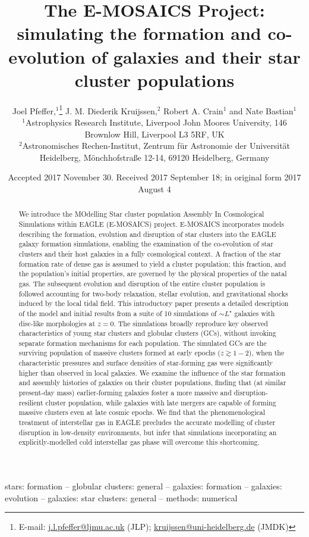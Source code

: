 \documentclass[fleqn,usenatbib]{mnras}
\title[The E-MOSAICS project]{The E-MOSAICS Project: simulating the formation and co-evolution of galaxies and their star cluster populations}
\author[J. Pfeffer et al.]{
Joel Pfeffer,$^{1}$\thanks{E-mail: \href{j.l.pfeffer@ljmu.ac.uk}{j.l.pfeffer@ljmu.ac.uk} (JLP); \href{kruijssen@uni-heidelberg.de}{kruijssen@uni-heidelberg.de} (JMDK)}
J. M. Diederik Kruijssen,$^{2}${\color{blue}\footnotemark[1]}
Robert A. Crain$^{1}$
and Nate Bastian$^{1}$
\\
$^{1}$Astrophysics Research Institute, Liverpool John Moores University, 146 Brownlow Hill, Liverpool L3 5RF, UK\\
$^{2}$Astronomisches Rechen-Institut, Zentrum f\"{u}r Astronomie der Universit\"{a}t Heidelberg, M\"{o}nchhofstra\ss e 12-14, 69120 Heidelberg, Germany\\
}
\date{Accepted 2017 November 30. Received 2017 September 18; in original form 2017 August 4}
\begin{document}
\label{firstpage}
\pagerange{\pageref{firstpage}--\pageref{lastpage}}
\maketitle

\begin{abstract}
We introduce the MOdelling Star cluster population Assembly In Cosmological Simulations within EAGLE (E-MOSAICS) project. E-MOSAICS incorporates models describing the formation, evolution and disruption of star clusters into the EAGLE galaxy formation simulations, enabling the examination of the co-evolution of star clusters and their host galaxies in a fully cosmological context. A fraction of the star formation rate of dense gas is assumed to yield a cluster population; this fraction, and the population's initial properties, are governed by the physical properties of the natal gas. The subsequent evolution and disruption of the entire cluster population is followed accounting for two-body relaxation, stellar evolution, and gravitational shocks induced by the local tidal field. This introductory paper presents a detailed description of the model and initial results from a suite of 10 simulations of $\sim L^\star$ galaxies with disc-like morphologies at $z=0$. The simulations broadly reproduce key observed characteristics of young star clusters and globular clusters (GCs), without invoking separate formation mechanisms for each population. The simulated GCs are the surviving population of massive clusters formed at early epochs ($z\gtrsim1-2$), when the characteristic pressures and surface densities of star-forming gas were significantly higher than observed in local galaxies. We examine the influence of the star formation and assembly histories of galaxies on their cluster populations, finding that (at similar present-day mass) earlier-forming galaxies foster a more massive and disruption-resilient cluster population, while galaxies with late mergers are capable of forming massive clusters even at late cosmic epochs. We find that the phenomenological treatment of interstellar gas in EAGLE precludes the accurate modelling of cluster disruption in low-density environments, but infer that simulations incorporating an explicitly-modelled cold interstellar gas phase will overcome this shortcoming.
\end{abstract}

\begin{keywords}
stars: formation -- globular clusters: general -- galaxies: formation -- galaxies: evolution -- galaxies: star clusters: general -- methods: numerical
\end{keywords}
\end{document}

